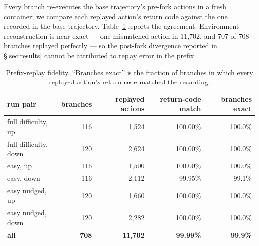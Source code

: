 \documentclass{article}
\begin{document}
Every branch re-executes the base trajectory's pre-fork actions in a fresh
container; we compare each replayed action's return code against the one
recorded in the base trajectory. Table~\ref{tab:fidelity} reports the
agreement. Environment reconstruction is near-exact --- one mismatched action
in 11{,}702, and 707 of 708 branches replayed perfectly --- so the post-fork
divergence reported in \S\ref{sec:results} cannot be attributed to replay
error in the prefix.

\begin{table}[h]
\centering
\small
\begin{tabular}{lrrrr}
\toprule
run pair & branches & replayed actions & return-code match & branches exact \\
\midrule
full difficulty, up   & 116 & 1{,}524 & 100.00\% & 100.0\% \\
full difficulty, down & 120 & 2{,}624 & 100.00\% & 100.0\% \\
easy, up              & 116 & 1{,}500 & 100.00\% & 100.0\% \\
easy, down            & 116 & 2{,}112 & 99.95\%  & 99.1\% \\
easy nudged, up       & 120 & 1{,}660 & 100.00\% & 100.0\% \\
easy nudged, down     & 120 & 2{,}282 & 100.00\% & 100.0\% \\
\midrule
\textbf{all}          & \textbf{708} & \textbf{11{,}702} & \textbf{99.99\%} & \textbf{99.9\%} \\
\bottomrule
\end{tabular}
\caption{Prefix-replay fidelity. ``Branches exact'' is the fraction of branches in which every replayed action's return code matched the recording.}
\label{tab:fidelity}
\end{table}
\end{document}
